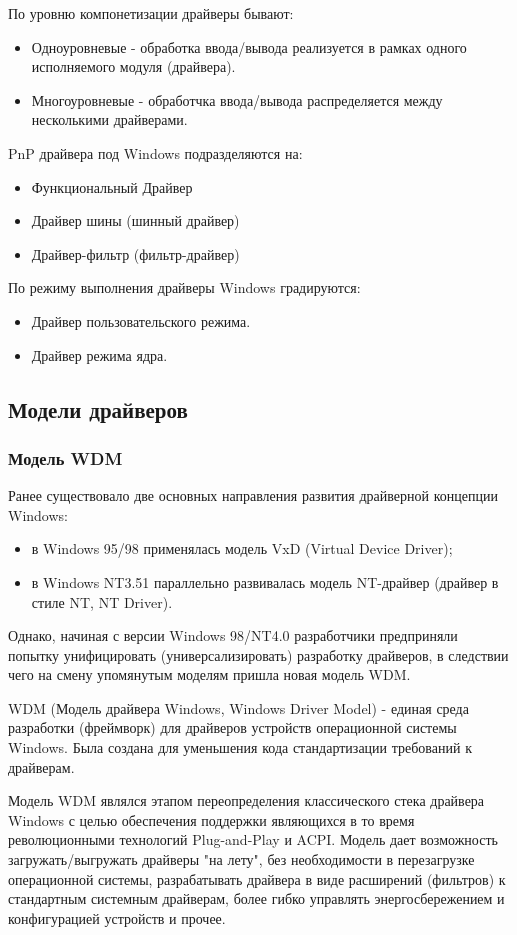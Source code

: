 \documentclass[14pt,a4paper]{article}
\begin{document}
По уровню компонетизации драйверы бывают:
\begin{itemize}
\item Одноуровневые - обработка ввода/вывода реализуется в рамках одного исполняемого модуля (драйвера).
\item Многоуровневые - обработчка ввода/вывода распределяется между несколькими драйверами.
\end{itemize}
PnP драйвера под Windows подразделяются на:

\begin{itemize}
\item Функциональный Драйвер
\item Драйвер шины (шинный драйвер)
\item Драйвер-фильтр (фильтр-драйвер)
\end{itemize}
По режиму выполнения драйверы Windows градируются:

\begin{itemize}
\item Драйвер пользовательского режима.
\item Драйвер режима ядра.
\end{itemize}

\subsection{Модели драйверов}
\subsubsection{Модель WDM}
Ранее существовало две основных направления развития драйверной концепции Windows:
\begin{itemize}
\item в Windows 95/98 применялась модель VxD (Virtual Device Driver);
\item в Windows NT3.51 параллельно развивалась модель NT-драйвер (драйвер в стиле NT, NT Driver).
\end{itemize} 
Однако, начиная с версии Windows 98/NT4.0 разработчики предприняли попытку унифицировать (универсализировать) разработку драйверов, в следствии чего на смену упомянутым моделям пришла новая модель WDM.\\

\par WDM (Модель драйвера Windows, Windows Driver Model) - единая среда разработки (фреймворк) для драйверов устройств операционной системы Windows. Была создана для уменьшения кода стандартизации требований к драйверам.\\
\par Модель WDM являлся этапом переопределения классического стека драйвера Windows с целью обеспечения поддержки являющихся в то время революционными технологий Plug-and-Play и ACPI. Модель дает возможность загружать/выгружать драйверы "на лету", без необходимости в перезагрузке операционной системы, разрабатывать драйвера в виде расширений (фильтров) к стандартным системным драйверам, более гибко управлять энергосбережением и конфигурацией устройств и прочее.\\
\end{document}
